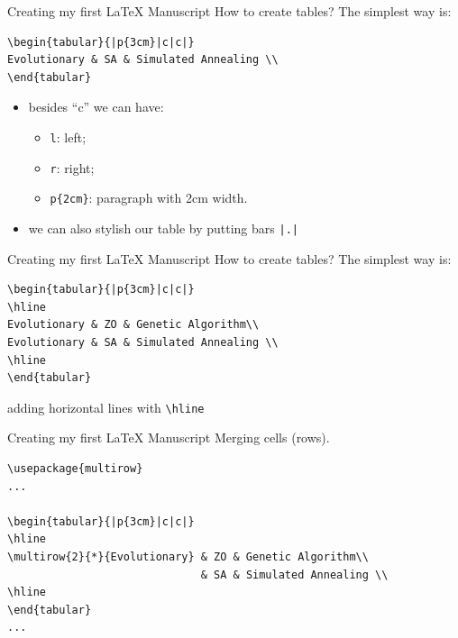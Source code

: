 \begin{frame}[fragile]{Creating my first \LaTeX{} Manuscript}
How to create tables? The simplest way is:
\footnotesize
\begin{verbatim}
\begin{tabular}{|p{3cm}|c|c|}
Evolutionary & SA & Simulated Annealing \\ 
\end{tabular}
\end{verbatim}
\begin{itemize}
\item besides ``c'' we can have:
      \begin{itemize}
        \item \verb!l!: left;
        \item \verb!r!: right;
        \item \verb!p{2cm}!: paragraph with 2cm width.
      \end{itemize}
\item we can also stylish our table by putting bars \verb!|.|!
\end{itemize}
\end{frame}


\begin{frame}[fragile]{Creating my first \LaTeX{} Manuscript}
How to create tables? The simplest way is:
\footnotesize
\begin{verbatim}
\begin{tabular}{|p{3cm}|c|c|}
\hline
Evolutionary & ZO & Genetic Algorithm\\ 
Evolutionary & SA & Simulated Annealing \\ 
\hline
\end{tabular}
\end{verbatim}
adding horizontal lines with \verb!\hline!
\end{frame}


\begin{frame}[fragile]{Creating my first \LaTeX{} Manuscript}
Merging cells (rows).
\footnotesize
\begin{verbatim}
\usepackage{multirow}
...

\begin{tabular}{|p{3cm}|c|c|}
\hline
\multirow{2}{*}{Evolutionary} & ZO & Genetic Algorithm\\ 
                              & SA & Simulated Annealing \\ 
\hline
\end{tabular}
...

\end{verbatim}
\end{frame}


